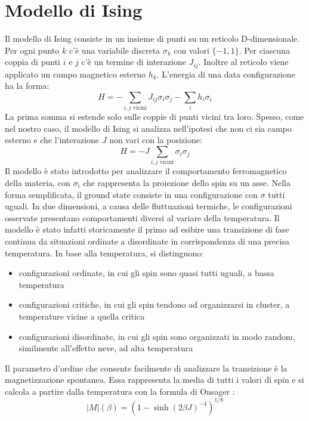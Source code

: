 \documentclass[Lau, noexaminfo, oneside]{sapthesis} %
\begin{document}
\chapter{Modello di Ising}
Il modello di Ising consiste in un insieme di punti su un reticolo D-dimensionale. Per ogni punto $k$ c'è una variabile discreta $\sigma_k$ con valori $\lbrace-1, 1\rbrace$. Per ciascuna coppia di punti $i$ e $j$ c'è un termine di interazione $J_{ij}$. Inoltre al reticolo viene applicato un campo magnetico esterno $h_{k}$. L'energia di una data configurazione ha la forma:
\begin{equation}
H = - \sum_{i,j \text{ vicini}} J_{ij} \sigma_i \sigma_j - \sum_i h_i \sigma_i
\end{equation}
La prima somma si estende solo sulle coppie di punti vicini tra loro. Spesso, come nel nostro caso, il modello di Ising si analizza nell'ipotesi che non ci sia campo esterno e che l'interazione $J$ non vari con la posizione:
\begin{equation}
H = -J \sum_{i,j \text{ vicini}}  \sigma_i \sigma_j
\end{equation}
Il modello è stato introdotto per analizzare il comportamento ferromagnetico della materia, con $\sigma_{i}$ che rappresenta la proiezione dello spin su un asse. Nella forma semplificata, il ground state consiste in una configurazione con $\sigma$ tutti uguali. In due dimensioni, a causa delle fluttuazioni termiche, le configurazioni osservate presentano comportamenti diversi al variare della temperatura. Il modello è stato infatti storicamente il primo ad esibire una transizione di fase continua da situazioni ordinate a disordinate in corrispondenza di una precisa temperatura.
In base alla temperatura, si distinguono:
\begin{itemize}
\item configurazioni ordinate, in cui gli spin sono quasi tutti uguali, a bassa temperatura
\item configurazioni critiche, in cui gli spin tendono ad organizzarsi in cluster, a temperature vicine a quella critica
\item configurazioni disordinate, in cui gli spin sono organizzati in modo random, similmente all'effetto neve, ad alta temperatura
\end{itemize}
Il parametro d'ordine che consente facilmente di analizzare la transizione è la magnetizzazione spontanea. Essa rappresenta la media di tutti i valori di spin e si calcola a partire dalla temperatura con la formula di Onsager \cite{onsager}:
\begin{equation}
|M|(\beta) = (1-\sinh(2\beta J)^{-4})^{1/8}
\end{equation}
\end{document}

